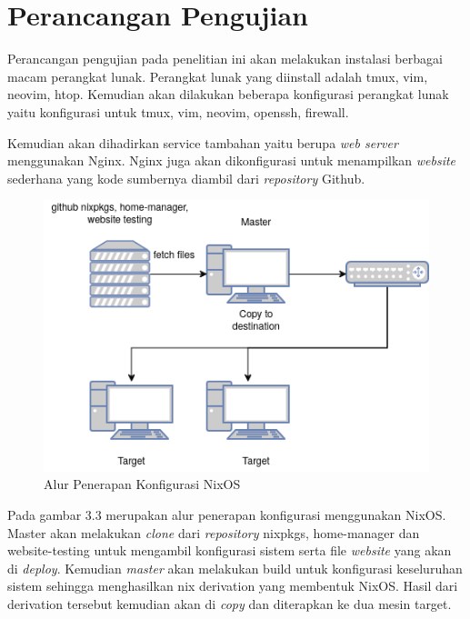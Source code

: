 \documentclass[10pt,]{report}
\begin{document}
\section{Perancangan Pengujian}
\begin{adjustwidth}{7mm}{}
	\hspace\parindent
	Perancangan pengujian pada penelitian ini akan melakukan instalasi berbagai
	macam perangkat lunak. Perangkat lunak yang diinstall adalah tmux, vim,
	neovim, htop. Kemudian akan dilakukan beberapa konfigurasi perangkat lunak
	yaitu konfigurasi untuk tmux, vim, neovim, openssh, firewall.

	Kemudian akan dihadirkan service tambahan yaitu berupa \textit{web server}
	menggunakan Nginx. Nginx juga akan dikonfigurasi untuk menampilkan
	\textit{website} sederhana yang kode sumbernya diambil dari
	\textit{repository} Github.
	\begin{figure}[H]
		\centering
		\includegraphics[width=\textwidth]{images/Topologi-NixOS.png}
		\caption{Alur Penerapan Konfigurasi NixOS}
	\end{figure}

	Pada gambar 3.3 merupakan alur penerapan konfigurasi menggunakan NixOS.
	Master akan melakukan \textit{clone} dari \textit{repository} nixpkgs,
	home-manager dan website-testing untuk mengambil konfigurasi sistem serta
	file \textit{website} yang akan di \textit{deploy}. Kemudian \textit{master}
	akan melakukan build untuk konfigurasi keseluruhan sistem sehingga
	menghasilkan nix derivation yang membentuk NixOS. Hasil dari derivation
	tersebut kemudian akan di \textit{copy} dan diterapkan ke dua mesin target.


\end{adjustwidth}
\end{document}
